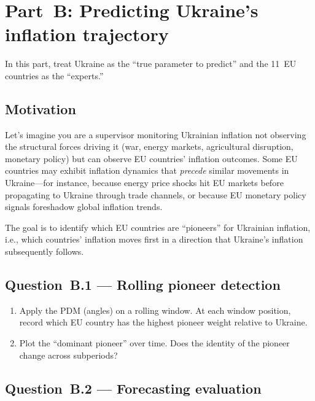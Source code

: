 \documentclass[11pt,a4paper]{article}
\begin{document}
\section{Part~B: Predicting Ukraine's inflation trajectory}

\noindent In this part, treat Ukraine as the ``true parameter to predict'' and the 11~EU countries as the ``experts.''

\subsection*{Motivation}

Let's imagine you are a supervisor monitoring Ukrainian inflation not observing the structural forces driving it (war, energy markets, agricultural disruption, monetary policy) but can observe EU countries' inflation outcomes. Some EU countries may exhibit inflation dynamics that \emph{precede} similar movements in Ukraine---for instance, because energy price shocks hit EU markets before propagating to Ukraine through trade channels, or because EU monetary policy signals foreshadow global inflation trends.

The goal is to identify which EU countries are ``pioneers'' for Ukrainian inflation, i.e., which countries' inflation moves first in a direction that Ukraine's inflation subsequently follows.

\subsection*{Question~B.1 --- Rolling pioneer detection}

\begin{enumerate}[label=(\alph*)]
    \item Apply the PDM (angles) on a rolling window. At each window position, record which EU country has the highest pioneer weight relative to Ukraine.
    \item Plot the ``dominant pioneer'' over time. Does the identity of the pioneer change across subperiods?
\end{enumerate}

\subsection*{Question~B.2 --- Forecasting evaluation}
\end{document}
